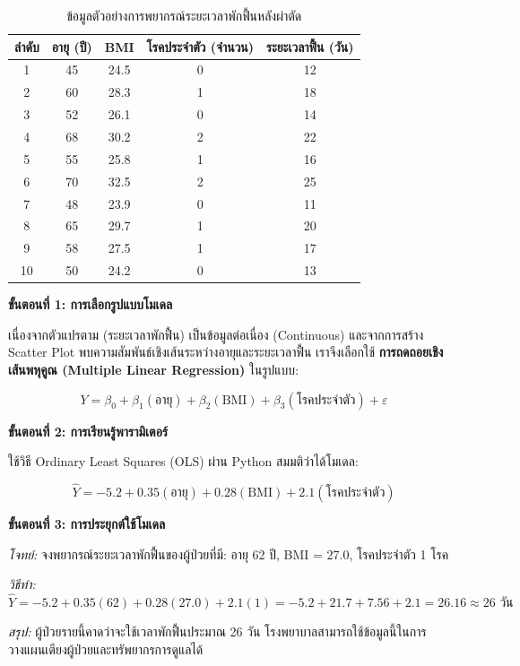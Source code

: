 \begin{table}[h]
\centering
\caption{ข้อมูลตัวอย่างการพยากรณ์ระยะเวลาพักฟื้นหลังผ่าตัด}
\label{T:recovery_data}
\begin{tabular}{|c|c|c|c|c|}
\hline
\textbf{ลำดับ} & \textbf{อายุ (ปี)} & \textbf{BMI} & \textbf{โรคประจำตัว (จำนวน)} & \textbf{ระยะเวลาฟื้น (วัน)} \\
\hline
1 & 45 & 24.5 & 0 & 12 \\
\hline
2 & 60 & 28.3 & 1 & 18 \\
\hline
3 & 52 & 26.1 & 0 & 14 \\
\hline
4 & 68 & 30.2 & 2 & 22 \\
\hline
5 & 55 & 25.8 & 1 & 16 \\
\hline
6 & 70 & 32.5 & 2 & 25 \\
\hline
7 & 48 & 23.9 & 0 & 11 \\
\hline
8 & 65 & 29.7 & 1 & 20 \\
\hline
9 & 58 & 27.5 & 1 & 17 \\
\hline
10 & 50 & 24.2 & 0 & 13 \\
\hline
\end{tabular}
\end{table}

\textbf{ขั้นตอนที่ 1: การเลือกรูปแบบโมเดล}

เนื่องจากตัวแปรตาม (ระยะเวลาพักฟื้น) เป็นข้อมูลต่อเนื่อง (Continuous) และจากการสร้าง Scatter Plot พบความสัมพันธ์เชิงเส้นระหว่างอายุและระยะเวลาฟื้น เราจึงเลือกใช้ \textbf{การถดถอยเชิงเส้นพหุคูณ (Multiple Linear Regression)} ในรูปแบบ:

$$Y = \beta_0 + \beta_1(\text{อายุ}) + \beta_2(\text{BMI}) + \beta_3(\text{โรคประจำตัว}) + \varepsilon$$

\textbf{ขั้นตอนที่ 2: การเรียนรู้พารามิเตอร์}

ใช้วิธี Ordinary Least Squares (OLS) ผ่าน Python สมมติว่าได้โมเดล:

$$\widehat{Y} = -5.2 + 0.35(\text{อายุ}) + 0.28(\text{BMI}) + 2.1(\text{โรคประจำตัว})$$

\textbf{ขั้นตอนที่ 3: การประยุกต์ใช้โมเดล}

\textit{โจทย์:} จงพยากรณ์ระยะเวลาพักฟื้นของผู้ป่วยที่มี: อายุ 62 ปี, BMI = 27.0, โรคประจำตัว 1 โรค

\textit{วิธีทำ:}
$$\widehat{Y} = -5.2 + 0.35(62) + 0.28(27.0) + 2.1(1) = -5.2 + 21.7 + 7.56 + 2.1 = 26.16 \approx 26 \text{ วัน}$$

\textit{สรุป:} ผู้ป่วยรายนี้คาดว่าจะใช้เวลาพักฟื้นประมาณ 26 วัน โรงพยาบาลสามารถใช้ข้อมูลนี้ในการวางแผนเตียงผู้ป่วยและทรัพยากรการดูแลได้

